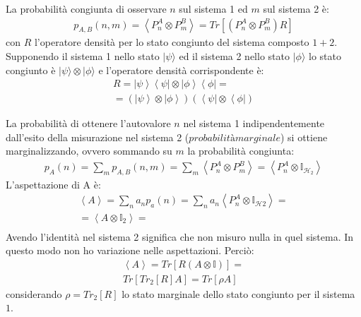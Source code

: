 La probabilità congiunta di osservare $n$ sul sistema 1 ed $m$ sul sistema 2 è:
\begin{equation}\begin{split}
p_{A,B}\left(n,m\right)=\left\langle P_n^A\otimes P_m^B \right\rangle=Tr\left[\left(P_n^A\otimes P_m^B\right)R\right]
\end{split}\end{equation}
con $R$ l'operatore densità per lo stato congiunto del sistema composto $1+2$.\\
Supponendo il sistema 1 nello stato $|\psi\rangle$ ed il sistema 2 nello stato $|\phi\rangle$ lo stato congiunto è $|\psi\rangle \otimes |\phi\rangle$ e l'operatore densità corrispondente è:
\begin{equation}\begin{split}
R=\left |\psi  \right\rangle\left\langle \psi \right |\otimes \left |\phi \right\rangle\left\langle \phi\right |=\\
=\left(\left |\psi  \right\rangle\otimes \left |\phi \right\rangle\right)\left(\left\langle \psi \right |\otimes \left\langle \phi\right |\right)
\end{split}\end{equation}

La probabilità di ottenere l'autovalore $n$ nel sistema 1 indipendentemente dall'esito della misurazione nel sistema 2 ($probabilità marginale$) si ottiene marginalizzando, ovvero sommando su $m$ la probabilità congiunta:
\begin{equation}\begin{split}
p_A\left(n\right)=\sum_m{p_{A,B}\left(n,m\right)}=\sum_m{\left\langle P_n^A\otimes P_m^B \right\rangle}=\left\langle P_n^A\otimes \mathbb{I}_{\mathcal{H}_2} \right\rangle
\end{split}\end{equation}
L'aspettazione di A è:
\begin{equation}\begin{split}
\left\langle A \right\rangle=\sum_n{a_np_a\left(n\right)}=\sum_n{a_n\left\langle P_n^A\otimes \mathbb{I}_{\mathcal{H}2} \right\rangle}=\\
=\left\langle A\otimes \mathbb{I}_2 \right\rangle =\\
\end{split}\end{equation}
Avendo l'identità nel sistema 2 significa che non misuro nulla in quel sistema. In questo modo non ho variazione nelle aspettazioni. Perciò:
\begin{equation}\begin{split}
\left\langle A \right\rangle=Tr\left[R\left(A\otimes \mathbb{I}\right)\right]=\\
Tr\left[Tr_2\left[R\right]A\right]=Tr\left[\rho A\right]
\end{split}\end{equation}
considerando $\rho=Tr_2\left[R\right]$ lo stato marginale dello stato congiunto per il sistema $1$.

